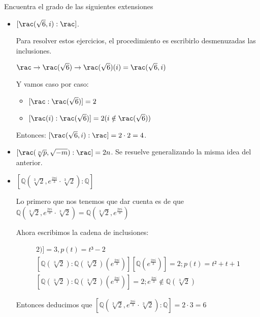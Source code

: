 \begin{problem}Encuentra el grado de las siguientes extensiones

\solution

\begin{itemize}

\item $[\rac(\sqrt{6},i):\rac]$.

 Para resolver estos ejercicios, el procedimiento es escribirlo desmenuzadas las inclusiones.

$\rac \to \rac(\sqrt{6}) \to \rac(\sqrt{6})(i) = \rac(\sqrt{6},i)$

Y vamos caso por caso:

\begin{itemize}
\item $[\rac: \rac(\sqrt{6})] = 2$
\item $[\rac(i): \rac(\sqrt{6}) ] = 2 (i \notin \rac(\sqrt{6}))$
\end{itemize}

Entonces: $[\rac(\sqrt{6},i):\rac]= 2\cdot 2 = 4$.

\item $[\rac(\sqrt[n]{p},\sqrt{-m}):\rac] = 2n$. Se resuelve generalizando la misma idea del anterior.

\item $[ℚ(\sqrt[3]{2},e^{\frac{2 \pi i}{3}}\cdot \sqrt[3]{2}):ℚ]$

Lo primero que nos tenemos que dar cuenta es de que \\
 $ℚ(\sqrt[3]{2},e^{\frac{2 \pi i}{3}}\cdot \sqrt[3]{2}) = ℚ(\sqrt[3]{2},e^{\frac{2 \pi i}{3}})$

Ahora escribimos la cadena de inclusiones:

\begin{gather*}
[ℚ : ℚ(\sqrt[3]{2})] = 3, p(t)=t³-2\\
[ℚ(\sqrt[3]{2}) : ℚ(\sqrt[3]{2})(e^{\frac{2\pi i}{3}})]  [ℚ(e^{\frac{2\pi i}{3}})] = 2; p(t) =  t²+t+1\\
[ℚ(\sqrt[3]{2}) : ℚ(\sqrt[3]{2})(e^{\frac{2\pi i}{3}})] = 2; e^{\frac{2\pi i}{3}}∉ℚ(\sqrt[3]{2})
\end{gather*}

Entonces deducimos que $[ℚ(\sqrt[3]{2},e^{\frac{2 \pi i}{3}}\cdot \sqrt[3]{2}):ℚ] = 2·3 = 6$
\end{itemize}

\end{problem}


